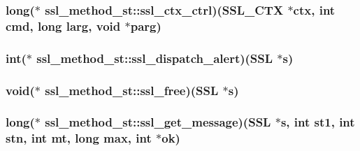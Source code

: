 \hypertarget{structssl__method__st_a61f10fd3d5215c108d31e750f48d9ec6}{
\subsubsection[{ssl\-\_\-ctx\-\_\-ctrl}]{\setlength{\rightskip}{0pt plus 5cm}long($\ast$ ssl\-\_\-method\-\_\-st\-::ssl\-\_\-ctx\-\_\-ctrl)(S\-S\-L\-\_\-\-C\-T\-X $\ast${\bf ctx}, int cmd, long larg, void $\ast$parg)}}\label{structssl__method__st_a61f10fd3d5215c108d31e750f48d9ec6}
\hypertarget{structssl__method__st_a9edf0cd5d4d18f3a0ac0250324c3cea1}{
\subsubsection[{ssl\-\_\-dispatch\-\_\-alert}]{\setlength{\rightskip}{0pt plus 5cm}int($\ast$ ssl\-\_\-method\-\_\-st\-::ssl\-\_\-dispatch\-\_\-alert)(S\-S\-L $\ast$s)}}\label{structssl__method__st_a9edf0cd5d4d18f3a0ac0250324c3cea1}
\hypertarget{structssl__method__st_aaa3352420812e9d4a769c42567bfc284}{
\subsubsection[{ssl\-\_\-free}]{\setlength{\rightskip}{0pt plus 5cm}void($\ast$ ssl\-\_\-method\-\_\-st\-::ssl\-\_\-free)(S\-S\-L $\ast$s)}}\label{structssl__method__st_aaa3352420812e9d4a769c42567bfc284}
\hypertarget{structssl__method__st_abc7d388378f3f61658ba3cb2ff8d493f}{
\subsubsection[{ssl\-\_\-get\-\_\-message}]{\setlength{\rightskip}{0pt plus 5cm}long($\ast$ ssl\-\_\-method\-\_\-st\-::ssl\-\_\-get\-\_\-message)(S\-S\-L $\ast$s, int st1, int stn, int mt, long max, int $\ast$ok)}}\label{structssl__method__st_abc7d388378f3f61658ba3cb2ff8d493f}
